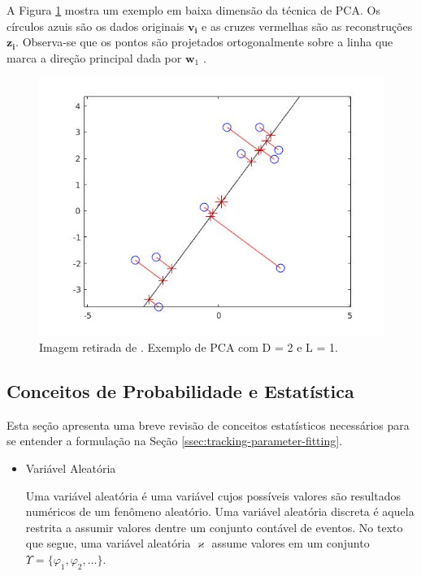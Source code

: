 {A Figura \ref{fig:PCA} mostra um exemplo em baixa dimensão da técnica de PCA. Os
círculos azuis são os dados originais $\mathbf{v_i}$ e as cruzes vermelhas são
as reconstruções $\mathbf{z_i}$. Observa-se que os pontos são projetados
ortogonalmente sobre a linha que marca a direção principal dada por
$\mathbf{w}_1$ \cite{machine-learning-book}.


\begin{figure}[!htb]
    \centering
    \includegraphics[width=0.8\linewidth]{./figs/pcaDemo.jpg}
% 
    \caption{Imagem retirada de \cite{machine-learning-book}. Exemplo de PCA com D = 2 e L = 1.}
    \label{fig:PCA}
\end{figure}





\subsection{Conceitos de Probabilidade e Estatística}
\label{ssec:review-probabilidade}

Esta seção apresenta uma breve revisão de conceitos estatísticos necessários
para se entender a formulação na Seção \ref{ssec:tracking-parameter-fitting}.

\begin{itemize}

\item Variável Aleatória

Uma variável aleatória é uma variável cujos possíveis valores são resultados
numéricos de um fenômeno aleatório. Uma variável aleatória discreta é aquela
restrita a assumir valores dentre um conjunto contável de eventos. No texto que
segue, uma variável aleatória $\varkappa$ assume valores em um conjunto
$\Upsilon = \{\varphi_1, \varphi_2, \ldots\}$.


\end{itemize}}
